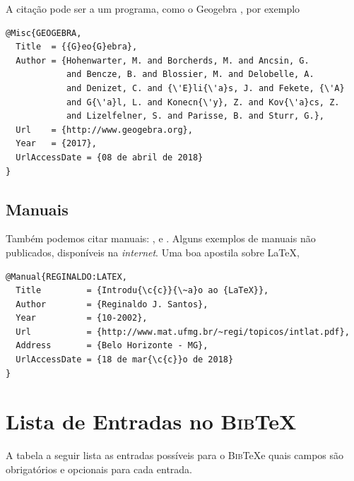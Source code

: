 \documentclass[fleqn]{profmat-cefet}
\newcommand{\BibTeX}   {\textsc{Bib}\TeX}
\begin{document}
A citação pode ser a um programa, como o Geogebra \cite{GEOGEBRA}, por exemplo
\begin{lstlisting}
@Misc{GEOGEBRA,
  Title  = {{G}eo{G}ebra},
  Author = {Hohenwarter, M. and Borcherds, M. and Ancsin, G. 
            and Bencze, B. and Blossier, M. and Delobelle, A. 
            and Denizet, C. and {\'E}li{\'a}s, J. and Fekete, {\'A} 
            and G{\'a}l, L. and Konecn{\'y}, Z. and Kov{\'a}cs, Z. 
            and Lizelfelner, S. and Parisse, B. and Sturr, G.},
  Url    = {http://www.geogebra.org},
  Year   = {2017},
  UrlAccessDate = {08 de abril de 2018}
}
\end{lstlisting}

\subsection{Manuais}

Também podemos citar manuais:
\citeauthor{REGINALDO:LATEX}, 
\citeauthor{MARCIO:LATEX} e
\citeauthor{RANIERE:LATEX}.
Alguns exemplos de manuais não publicados, disponíveis na \textit{internet}.
Uma boa apostila sobre \LaTeX, \cite{REGINALDO:LATEX}
\begin{lstlisting}
@Manual{REGINALDO:LATEX,
  Title         = {Introdu{\c{c}}{\~a}o ao {LaTeX}},
  Author        = {Reginaldo J. Santos},
  Year          = {10-2002},
  Url           = {http://www.mat.ufmg.br/~regi/topicos/intlat.pdf},
  Address       = {Belo Horizonte - MG},
  UrlAccessDate = {18 de mar{\c{c}}o de 2018}
}
\end{lstlisting}

\section{Lista de Entradas no \BibTeX}

A tabela a seguir lista as entradas possíveis para o \BibTeX e quais campos são
obrigatórios e opcionais para cada entrada.
\end{document}
